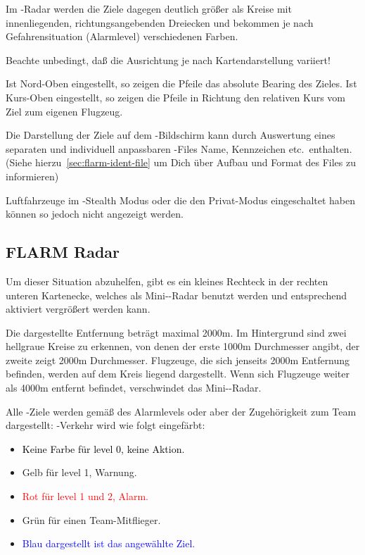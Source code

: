 Im \fl-Radar werden die Ziele dagegen deutlich größer als Kreise mit innenliegenden,
richtungsangebenden Dreiecken  und bekommen je nach Gefahrensituation (Alarmlevel)
verschiedenen Farben.

\achtung Beachte unbedingt, daß die Ausrichtung je nach Kartendarstellung variiert!

Ist Nord-Oben eingestellt, so zeigen die Pfeile das absolute Bearing des Zieles.
Ist Kurs-Oben eingestellt, so zeigen die Pfeile in Richtung den relativen Kurs vom Ziel
zum eigenen Flugzeug.

Die Darstellung der Ziele auf dem \fl-Bildschirm kann durch Auswertung eines separaten
und individuell anpassbaren  \fl-Files Name, Kennzeichen etc.\ enthalten.
(Siehe hierzu~\ref{sec:flarm-ident-file} um Dich über Aufbau und Format des Files zu informieren)

Luftfahrzeuge im \fl-Stealth Modus oder die den Privat-Modus eingeschaltet haben können so jedoch nicht angezeigt werden.


\subsection*{FLARM Radar}
Um dieser Situation abzuhelfen, gibt es ein kleines Rechteck in der rechten unteren Kartenecke,
welches als Mini-\fl-Radar benutzt werden und entsprechend aktiviert vergrößert werden kann.

Die dargestellte Entfernung beträgt maximal 2000m. Im Hintergrund sind zwei hellgraue Kreise zu erkennen,
von denen der erste 1000m Durchmesser angibt, der zweite zeigt 2000m Durchmesser.
Flugzeuge, die sich jenseits 2000m Entfernung befinden, werden auf dem Kreis liegend dargestellt.
Wenn sich Flugzeuge weiter als 4000m entfernt befindet, verschwindet das Mini-\fl-Radar.


Alle \fl-Ziele werden gemäß des Alarmlevels  oder aber der Zugehörigkeit zum Team dargestellt:
\fl-Verkehr wird wie folgt eingefärbt:
\begin{itemize}
\item \textcolor{black} {Keine Farbe für level 0, keine Aktion.}
\item \textcolor{warning} { Gelb für level 1, Warnung.}
\item \textcolor{red} {Rot für level 1 und 2, Alarm.}
\item \textcolor{teammate} {Grün für einen Team-Mitflieger.}
\item \textcolor{blue} {Blau dargestellt ist das angewählte Ziel.}
\end{itemize}



